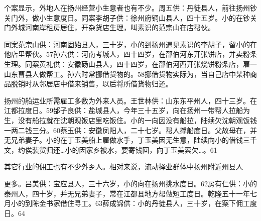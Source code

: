 \vfill
\begin{BookNotes}
\end{BookNotes}

\noindent 个案显示，外地人在扬州经营小生意者也有不少。周五供：丹徒县人，前往扬州钞关门外，做小生意度日。同案李胡子供：徐州府铜山县人，四十五岁。小的在钞关门外城河南岸租房居住，开杂货店生理，叫素识的范宗山在店帮伙。

同案范宗山供：河南固始县人，三十岁，小的到扬州遇见素识的李胡子，留小的在他店里帮伙。57孙六供：河南考城人，四十四岁，在邵伯河东开张饼店，并卖粉条生理。同案黄礼供：安徽砀山县人，四十四岁，在邵伯河西开张烧饼粉条店，雇一山东曹县人做帮工。孙六时常挪借货物的。58挪借货物实际为，当自己店中某种商品脱销时从邻居店中借来销售，以后将所借货物归还。


\noindent 扬州的船运业所需雇工多数为外来人员。王世林供：山东东平州人，四十三岁。在江都拉度日。59邰子良供：盐城县人，今年三十五岁，向在扬州一带帮人拉船为生，没有船拉就在沈朝观饭店里吃饭住。小的一向因没有船拉，陆续欠沈朝观饭钱一两二钱三分。60蔡玉供：安徽凤阳人，二十七岁。帮人撑船度日。父故母在，并无兄弟妻子。小的在丁玉美船上雇做水手，丁玉美因无生意，陆续向小的借钱三千文，约俟装货归还…小的因家乡被水，要寄钱回，向丁玉美索欠…。61

其它行业的佣工也有不少外乡人。相对来说，流动择业群体中扬州附近州县人

\vfill
\begin{BookNotes}
\end{BookNotes}

\noindent 更多。吕美供：宝应县人，三十六岁，小的向在扬州挑水度日。62房有仁供：小的泰州人，四十岁，并无兄弟妻子，常在江都县地方帮做短工度日。乾隆五十一年七月小的到陈金书家借住寻工。63薛成锦供：小的丹徒县人，三十岁，在案下佣工度日。64

